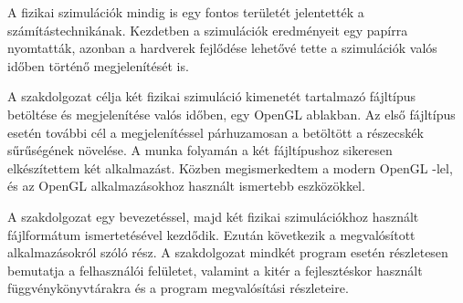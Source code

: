 A fizikai szimulációk mindig is egy fontos
területét jelentették a számítástechnikának.
Kezdetben a szimulációk eredményeit egy papírra nyomtatták,
azonban a hardverek fejlődése lehetővé tette
a szimulációk valós időben történő megjelenítését is.

A szakdolgozat célja 
két fizikai szimuláció kimenetét tartalmazó
fájltípus betöltése és megjelenítése valós időben,
egy OpenGL ablakban.
Az első fájltípus esetén további cél
a megjelenítéssel párhuzamosan
a betöltött a részecskék sűrűségének növelése.
A munka folyamán a két fájltípushoz 
sikeresen elkészítettem két alkalmazást.
Közben megismerkedtem a modern OpenGL -lel, 
és az OpenGL alkalmazásokhoz 
használt ismertebb eszközökkel.
 
A szakdolgozat egy bevezetéssel, 
majd két fizikai szimulációkhoz használt 
fájlformátum ismertetésével kezdődik.
Ezután következik a megvalósított alkalmazásokról
szóló rész.
A szakdolgozat mindkét program esetén 
részletesen bemutatja a felhasználói felületet,
valamint a kitér 
a fejlesztéskor használt függvénykönyvtárakra
és a program megvalósítási részleteire.










